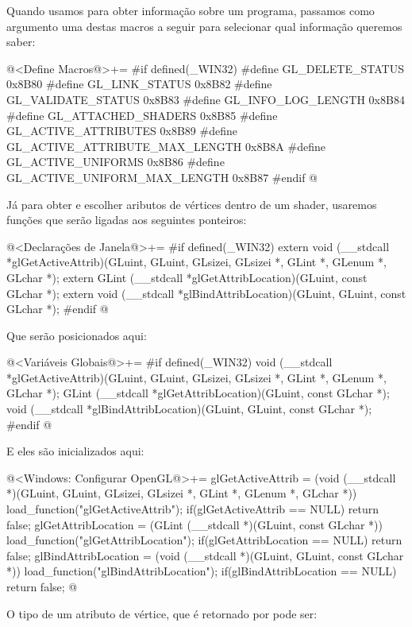 Quando usamos  para obter informação sobre
um programa, passamos como argumento uma destas macros a seguir para
selecionar qual informação queremos saber:

\iniciocodigo
@<Define Macros@>+=
#if defined(_WIN32)
#define GL_DELETE_STATUS               0x8B80
#define GL_LINK_STATUS                 0x8B82
#define GL_VALIDATE_STATUS             0x8B83
#define GL_INFO_LOG_LENGTH             0x8B84
#define GL_ATTACHED_SHADERS            0x8B85
#define GL_ACTIVE_ATTRIBUTES           0x8B89
#define GL_ACTIVE_ATTRIBUTE_MAX_LENGTH 0x8B8A
#define GL_ACTIVE_UNIFORMS             0x8B86
#define GL_ACTIVE_UNIFORM_MAX_LENGTH   0x8B87
#endif
@
\fimcodigo

Já para obter e escolher aributos de vértices dentro de um shader,
usaremos funções que serão ligadas aos seguintes ponteiros:

\iniciocodigo
@<Declarações de Janela@>+=
#if defined(_WIN32)
extern void (__stdcall *glGetActiveAttrib)(GLuint, GLuint, GLsizei, GLsizei *,
                                           GLint *, GLenum *, GLchar *);
extern GLint (__stdcall *glGetAttribLocation)(GLuint, const GLchar *);
extern void (__stdcall *glBindAttribLocation)(GLuint, GLuint, const GLchar *);
#endif
@
\fimcodigo

Que serão posicionados aqui:

\iniciocodigo
@<Variáveis Globais@>+=
#if defined(_WIN32)
void (__stdcall *glGetActiveAttrib)(GLuint, GLuint, GLsizei, GLsizei *, GLint *,
                                    GLenum *, GLchar *);
GLint (__stdcall *glGetAttribLocation)(GLuint, const GLchar *);
void (__stdcall *glBindAttribLocation)(GLuint, GLuint, const GLchar *);
#endif
@
\fimcodigo

E eles são inicializados aqui:

\iniciocodigo
@<Windows: Configurar OpenGL@>+=
glGetActiveAttrib = (void (__stdcall *)(GLuint, GLuint, GLsizei, GLsizei *,
                                        GLint *, GLenum *, GLchar *))
                    load_function("glGetActiveAttrib");
if(glGetActiveAttrib == NULL) return false;
glGetAttribLocation = (GLint (__stdcall *)(GLuint, const GLchar *))
                           load_function("glGetAttribLocation");
if(glGetAttribLocation == NULL) return false;
glBindAttribLocation = (void (__stdcall *)(GLuint, GLuint, const GLchar *))
                              load_function("glBindAttribLocation");
if(glBindAttribLocation == NULL) return false;
@
\fimcodigo

O tipo de um atributo de vértice, que é retornado
por  pode ser:

